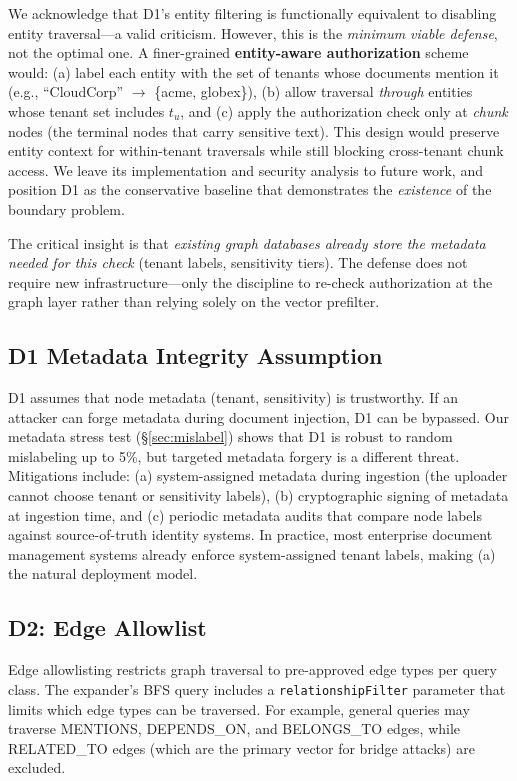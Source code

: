 \documentclass[letterpaper,twocolumn,10pt]{article}
\begin{document}
We acknowledge that D1's entity filtering is functionally equivalent
to disabling entity traversal---a valid criticism. However, this is
the \emph{minimum viable defense}, not the optimal one. A
finer-grained \textbf{entity-aware authorization} scheme would: (a)
label each entity with the set of tenants whose documents mention it
(e.g., ``CloudCorp'' $\to$ \{acme, globex\}), (b) allow traversal
\emph{through} entities whose tenant set includes $t_u$, and (c) apply
the authorization check only at \emph{chunk} nodes (the terminal
nodes that carry sensitive text). This design would preserve entity
context for within-tenant traversals while still blocking cross-tenant
chunk access. We leave its implementation and security analysis
to future work, and position D1 as the conservative baseline that
demonstrates the \emph{existence} of the boundary problem.

The critical insight is that \emph{existing graph databases already
store the metadata needed for this check} (tenant labels, sensitivity
tiers). The defense does not require new infrastructure---only the
discipline to re-check authorization at the graph layer rather than
relying solely on the vector prefilter.

\subsection{D1 Metadata Integrity Assumption}
\label{sec:metadata-integrity}

D1 assumes that node metadata (tenant, sensitivity) is trustworthy.
If an attacker can forge metadata during document injection, D1 can
be bypassed. Our metadata stress test (\S\ref{sec:mislabel}) shows
that D1 is robust to random mislabeling up to 5\%, but targeted
metadata forgery is a different threat. Mitigations include:
(a) system-assigned metadata during ingestion (the uploader cannot
choose tenant or sensitivity labels), (b) cryptographic signing of
metadata at ingestion time, and (c) periodic metadata audits that
compare node labels against source-of-truth identity systems. In
practice, most enterprise document management systems already enforce
system-assigned tenant labels, making (a) the natural deployment
model.

\subsection{D2: Edge Allowlist}

Edge allowlisting restricts graph traversal to pre-approved edge
types per query class. The expander's BFS query includes a
\texttt{relationshipFilter} parameter that limits which edge types
can be traversed. For example, general queries may traverse MENTIONS,
DEPENDS\_ON, and BELONGS\_TO edges, while RELATED\_TO edges (which
are the primary vector for bridge attacks) are excluded.
\end{document}
